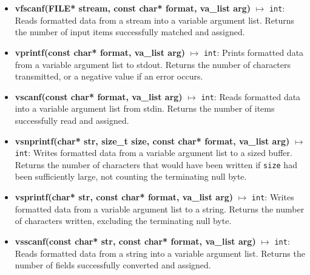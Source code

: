 \documentclass{report}
\begin{document}
\begin{itemize}
        \item \textbf{vfscanf(FILE* stream, const char* format, va\_list arg)} $\mapsto$ \texttt{int}: Reads formatted data from a stream into a variable argument list. Returns the number of input items successfully matched and assigned.
        \item \textbf{vprintf(const char* format, va\_list arg)} $\mapsto$ \texttt{int}: Prints formatted data from a variable argument list to stdout. Returns the number of characters transmitted, or a negative value if an error occurs.
        \item \textbf{vscanf(const char* format, va\_list arg)} $\mapsto$ \texttt{int}: Reads formatted data into a variable argument list from stdin. Returns the number of items successfully read and assigned.
        \item \textbf{vsnprintf(char* str, size\_t size, const char* format, va\_list arg)} $\mapsto$ \texttt{int}: Writes formatted data from a variable argument list to a sized buffer. Returns the number of characters that would have been written if \texttt{size} had been sufficiently large, not counting the terminating null byte.
        \item \textbf{vsprintf(char* str, const char* format, va\_list arg)} $\mapsto$ \texttt{int}: Writes formatted data from a variable argument list to a string. Returns the number of characters written, excluding the terminating null byte.
        \item \textbf{vsscanf(const char* str, const char* format, va\_list arg)} $\mapsto$ \texttt{int}: Reads formatted data from a string into a variable argument list. Returns the number of fields successfully converted and assigned.
    \end{itemize}

    \bigbreak \noindent 
\end{document}
